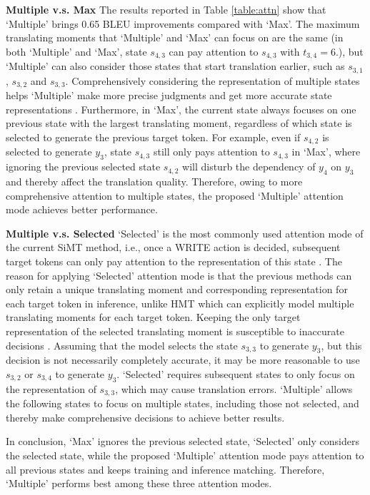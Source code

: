 \documentclass{article} %
\begin{document}
\textbf{Multiple v.s. Max} The results reported in Table \ref{table:attn} show that `Multiple' brings 0.65 BLEU improvements compared with `Max'. The maximum translating moments that `Multiple' and `Max' can focus on are the same (in both `Multiple' and `Max', state $s_{4,3}$ can pay attention to $s_{4,3}$ with $t_{3,4}=6$.), but `Multiple' can also consider those states that start translation earlier, such as $s_{3,1}$, $s_{3,2}$ and $s_{3,3}$. Comprehensively considering the representation of multiple states helps `Multiple' make more precise judgments and get more accurate state representations \citep{zhang-feng-2021-universal}. Furthermore, in `Max', the current state always focuses on one previous state with the largest translating moment, regardless of which state is selected to generate the previous target token. For example, even if $s_{4,2}$ is selected to generate $y_{3}$, state $s_{4,3}$ still only pays attention to $s_{4,3}$ in `Max', where ignoring the previous selected state $s_{4,2}$ will disturb the dependency of $y_{4}$ on $y_{3}$ and thereby affect the translation quality. Therefore, owing to more comprehensive attention to multiple states, the proposed `Multiple' attention mode achieves better performance.

\textbf{Multiple v.s. Selected} `Selected' is the most commonly used attention mode of the current SiMT method, i.e., once a WRITE action is decided, subsequent target tokens can only pay attention to the representation of this state \citep{ma-etal-2019-stacl,Arivazhagan2019,Ma2019a}. The reason for applying `Selected' attention mode is that the previous methods can only retain a unique translating moment and corresponding representation for each target token in inference, unlike HMT which can explicitly model multiple translating moments for each target token. Keeping the only target representation of the selected translating moment is susceptible to inaccurate decisions \citep{zheng-etal-2020-opportunistic}. Assuming that the model selects the state $s_{3,3}$ to generate $y_3$, but this decision is not necessarily completely accurate, it may be more reasonable to use $s_{3,2}$ or $s_{3, 4}$ to generate $y_3$. `Selected' requires subsequent states to only focus on the representation of $s_{3,3}$, which may cause translation errors. `Multiple' allows the following states to focus on multiple states, including those not selected, and thereby make comprehensive decisions to achieve better results.

In conclusion, `Max' ignores the previous selected state, `Selected' only considers the selected state, while the proposed `Multiple' attention mode pays attention to all previous states and keeps training and inference matching. Therefore, `Multiple' performs best among these three attention modes.
\end{document}

